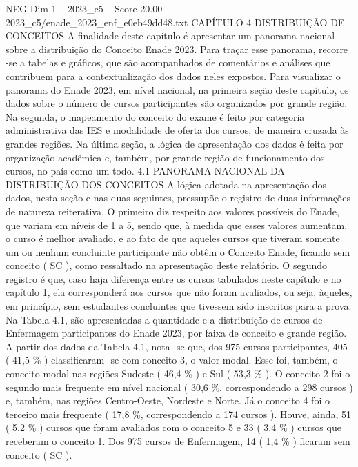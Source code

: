 \begin{textsample}{NEG Dim 1 – 2023\_c5 – Score 20.00 – 2023\_c5/enade\_2023\_enf\_e0eb49dd48.txt}  \label{ex:f1_neg_425}
CAPÍTULO 4 DISTRIBUIÇÃO DE CONCEITOS A finalidade deste capítulo é apresentar um panorama nacional sobre a distribuição do Conceito Enade 2023.
Para traçar esse panorama, recorre -se a tabelas e gráficos, que são acompanhados de comentários e análises que contribuem para a contextualização dos dados neles expostos.
Para visualizar o panorama do Enade 2023, em nível nacional, na primeira seção deste capítulo, os dados sobre o número de cursos participantes são organizados por grande região.
Na segunda, o mapeamento do conceito do exame é feito por categoria administrativa das IES e modalidade de oferta dos cursos, de maneira cruzada às grandes regiões.
Na última seção, a lógica de apresentação dos dados é feita por organização acadêmica e, também, por grande região de funcionamento dos cursos, no país como um todo. 4.1 PANORAMA NACIONAL DA DISTRIBUIÇÃO DOS CONCEITOS A lógica adotada na apresentação dos dados, nesta seção e nas duas seguintes, pressupõe o registro de duas informações de natureza reiterativa.
O primeiro diz respeito aos valores possíveis do Enade, que variam em níveis de 1 a 5, sendo que, à medida que esses valores aumentam, o curso é melhor avaliado, e ao fato de que aqueles cursos que tiveram somente um ou nenhum concluinte participante não obtêm o Conceito Enade, ficando sem conceito ( SC ), como ressaltado na apresentação deste relatório.
O segundo registro é que, caso haja diferença entre os cursos tabulados neste capítulo e no capítulo 1, ela corresponderá aos cursos que não foram avaliados, ou seja, àqueles, em princípio, sem estudantes concluintes que tivessem sido inscritos para a prova.
Na Tabela 4.1, são apresentadas a quantidade e a distribuição de cursos de Enfermagem participantes do Enade 2023, por faixa de conceito e grande região.
A partir dos dados da Tabela 4.1, nota -se que, dos 975 cursos participantes, 405 ( 41,5 \% ) classificaram -se com conceito 3, o valor modal.
Esse foi, também, o conceito modal nas regiões Sudeste ( 46,4 \% ) e Sul ( 53,3 \% ).
O conceito 2 foi o segundo mais frequente em nível nacional ( 30,6 \%, correspondendo a 298 cursos ) e, também, nas regiões Centro-Oeste, Nordeste e Norte.
Já o conceito 4 foi o terceiro mais frequente ( 17,8 \%, correspondendo a 174 cursos ).
Houve, ainda, 51 ( 5,2 \% ) cursos que foram avaliados com o conceito 5 e 33 ( 3,4 \% ) cursos que receberam o conceito 1.
Dos 975 cursos de Enfermagem, 14 ( 1,4 \% ) ficaram sem conceito ( SC ).

\end{textsample}
